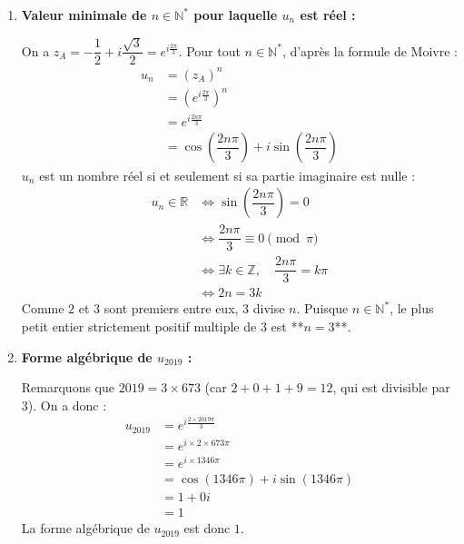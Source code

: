 \documentclass[12pt,a4paper]{article}
\begin{document}
\begin{enumerate}
    Le triangle $\Omega AD$ étant équilatéral, le centre $G$ de son cercle circonscrit est confondu avec son centre de gravité :
    $$
    \begin{aligned}
        z_G &= \dfrac{z_{\Omega} + z_A + z_D}{3} \\
        &= \dfrac{1 + \left(-\dfrac{1}{2} + i\dfrac{\sqrt{3}}{2}\right) + \left(-\dfrac{1}{2} - i\dfrac{\sqrt{3}}{2}\right)}{3} \\
        &= \dfrac{1 - 1 + 0}{3} \\
        &= 0
    \end{aligned}
    $$
    Le centre du cercle circonscrit au triangle $\Omega AD$ est l'origine $O$, d'affixe $0$.

    \item \textbf{Valeur minimale de $n \in \mathbb{N}^*$ pour laquelle $u_n$ est réel :}
    
    On a $z_A = -\dfrac{1}{2} + i\dfrac{\sqrt{3}}{2} = e^{i\frac{2\pi}{3}}$. Pour tout $n \in \mathbb{N}^*$, d'après la formule de Moivre :
    $$
    \begin{aligned}
        u_n &= (z_A)^n \\
        &= \left(e^{i\frac{2\pi}{3}}\right)^n \\
        &= e^{i\frac{2n\pi}{3}} \\
        &= \cos\left(\dfrac{2n\pi}{3}\right) + i\sin\left(\dfrac{2n\pi}{3}\right)
    \end{aligned}
    $$
    $u_n$ est un nombre réel si et seulement si sa partie imaginaire est nulle :
    $$
    \begin{aligned}
        u_n \in \mathbb{R} &\iff \sin\left(\dfrac{2n\pi}{3}\right) = 0 \\
        &\iff \dfrac{2n\pi}{3} \equiv 0 \pmod{\pi} \\
        &\iff \exists k \in \mathbb{Z}, \quad \dfrac{2n\pi}{3} = k\pi \\
        &\iff 2n = 3k
    \end{aligned}
    $$
    Comme $2$ et $3$ sont premiers entre eux, $3$ divise $n$. Puisque $n \in \mathbb{N}^*$, le plus petit entier strictement positif multiple de $3$ est **$n = 3$**.

    \item \textbf{Forme algébrique de $u_{2019}$ :}
    
    Remarquons que $2019 = 3 \times 673$ (car $2 + 0 + 1 + 9 = 12$, qui est divisible par $3$). On a donc :
    $$
    \begin{aligned}
        u_{2019} &= e^{i\frac{2 \times 2019 \pi}{3}} \\
        &= e^{i \times 2 \times 673\pi} \\
        &= e^{i \times 1346\pi} \\
        &= \cos(1346\pi) + i\sin(1346\pi) \\
        &= 1 + 0i \\
        &= 1
    \end{aligned}
    $$
    La forme algébrique de $u_{2019}$ est donc $1$.
\end{enumerate}
\end{document}
